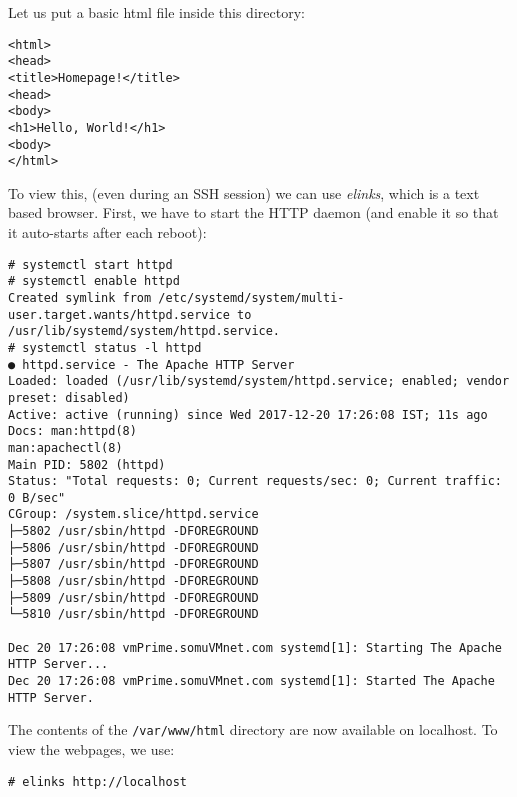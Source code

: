 Let us put a basic html file inside this directory:

\vspace{-15pt}
\begin{verbatim}
<html>
<head>
<title>Homepage!</title>
<head>
<body>
<h1>Hello, World!</h1>
<body>
</html>
\end{verbatim}
\vspace{-10pt}

\noindent
To view this, (even during an SSH session) we can use \textit{elinks}, which is a text based browser. First, we have to start the HTTP daemon (and enable it so that it auto-starts after each reboot):

\vspace{-15pt}
\begin{verbatim}
# systemctl start httpd
# systemctl enable httpd
Created symlink from /etc/systemd/system/multi-user.target.wants/httpd.service to /usr/lib/systemd/system/httpd.service.
# systemctl status -l httpd
● httpd.service - The Apache HTTP Server
Loaded: loaded (/usr/lib/systemd/system/httpd.service; enabled; vendor preset: disabled)
Active: active (running) since Wed 2017-12-20 17:26:08 IST; 11s ago
Docs: man:httpd(8)
man:apachectl(8)
Main PID: 5802 (httpd)
Status: "Total requests: 0; Current requests/sec: 0; Current traffic:   0 B/sec"
CGroup: /system.slice/httpd.service
├─5802 /usr/sbin/httpd -DFOREGROUND
├─5806 /usr/sbin/httpd -DFOREGROUND
├─5807 /usr/sbin/httpd -DFOREGROUND
├─5808 /usr/sbin/httpd -DFOREGROUND
├─5809 /usr/sbin/httpd -DFOREGROUND
└─5810 /usr/sbin/httpd -DFOREGROUND

Dec 20 17:26:08 vmPrime.somuVMnet.com systemd[1]: Starting The Apache HTTP Server...
Dec 20 17:26:08 vmPrime.somuVMnet.com systemd[1]: Started The Apache HTTP Server.
\end{verbatim}
\vspace{-10pt}

The contents of the \verb|/var/www/html| directory are now available on localhost. To view the webpages, we use:

\vspace{-15pt}
\begin{verbatim}
# elinks http://localhost
\end{verbatim}
\vspace{-10pt}
